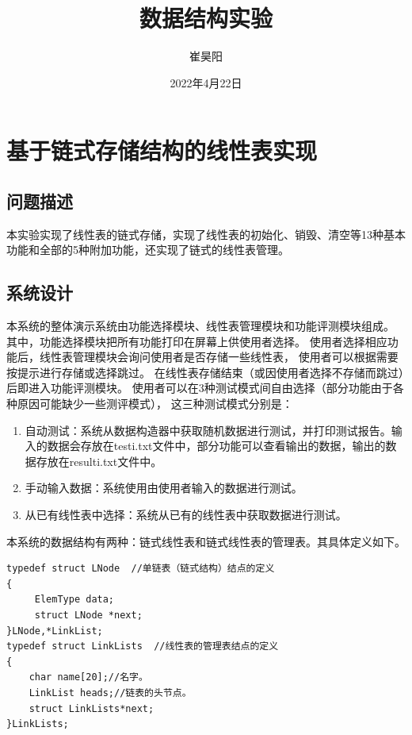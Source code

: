 \documentclass[supercite]{Experimental_Report}
\title{~~~~~~数据结构实验~~~~~~}
\author{崔昊阳}
\date{2022年4月22日}
\theoremstyle{definition}
\begin{document}
\maketitle


\clearpage


\tableofcontents[level=2]

\clearpage


\section{基于链式存储结构的线性表实现}


\subsection{问题描述}

本实验实现了线性表的链式存储，实现了线性表的初始化、销毁、清空等13种基本功能和全部的5种附加功能，还实现了链式的线性表管理。

\subsection{系统设计}

本系统的整体演示系统由功能选择模块、线性表管理模块和功能评测模块组成。
其中，功能选择模块把所有功能打印在屏幕上供使用者选择。
使用者选择相应功能后，线性表管理模块会询问使用者是否存储一些线性表，
使用者可以根据需要按提示进行存储或选择跳过。
在线性表存储结束（或因使用者选择不存储而跳过）后即进入功能评测模块。
使用者可以在3种测试模式间自由选择（部分功能由于各种原因可能缺少一些测评模式），
这三种测试模式分别是：
\begin{enumerate}
\renewcommand{\labelenumi}{\theenumi)}
	\item 自动测试：系统从数据构造器中获取随机数据进行测试，并打印测试报告。输入的数据会存放在testi.txt文件中，部分功能可以查看输出的数据，输出的数据存放在resulti.txt文件中。
	\item 手动输入数据：系统使用由使用者输入的数据进行测试。
	\item 从已有线性表中选择：系统从已有的线性表中获取数据进行测试。
\end{enumerate}

本系统的数据结构有两种：链式线性表和链式线性表的管理表。其具体定义如下。

\begin{lstlisting}[title = 定义,frame=none]
typedef struct LNode  //单链表（链式结构）结点的定义
{
     ElemType data;
     struct LNode *next;
}LNode,*LinkList;
typedef struct LinkLists  //线性表的管理表结点的定义 
{
 	char name[20];//名字。 
 	LinkList heads;//链表的头节点。 
 	struct LinkLists*next;
}LinkLists;
\end{lstlisting}
\end{document}
